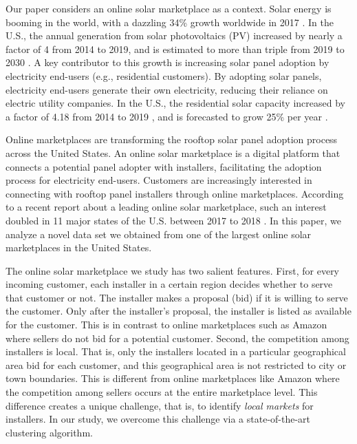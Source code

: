 \documentclass[msom,blindrev]{informs3}
\begin{document}
	
	Our paper considers an online solar marketplace as a context. Solar energy is booming in the world, with a dazzling 34\% growth worldwide in 2017 \citep{iea2018snapshot}. In the U.S., the annual generation from solar photovoltaics (PV) increased by nearly a factor of 4 from 2014 to 2019, and is estimated to more than triple from 2019 to 2030 \citep{USEIA-I,USEIA-II}. A key contributor to this growth is increasing solar panel adoption by electricity end-users (e.g., residential customers). By adopting solar panels, electricity end-users generate their own electricity, reducing their reliance on electric utility companies. In the U.S., the residential solar capacity increased by a factor of 4.18 from 2014 to 2019 \citep{USEIA-III}, and is forecasted to grow 25\% per year \citep{weaver_2019,seia,gtmsolar2018}.
	
	Online marketplaces are transforming the rooftop solar panel adoption process across the United States. An online solar marketplace is a digital platform that connects a potential panel adopter with installers, facilitating the adoption process for electricity end-users. Customers are increasingly interested in connecting with rooftop panel installers through online marketplaces. According to a recent report about a leading online solar marketplace, such an interest doubled in 11 major states of the U.S. between 2017 to 2018 \citep{energysageintel19}.  In this paper, we analyze a novel data set we obtained from one of the largest online solar marketplaces in the United States.
	
	
	The online solar marketplace we study has two salient features. First, for every incoming customer, each installer in a certain region decides whether to serve that customer or not. The installer makes a proposal (bid) if it is willing to serve the customer. Only after the installer's proposal, the installer is listed as available for the customer. This is in contrast to online marketplaces such as Amazon where sellers do not bid for a potential customer. Second, the competition among installers is local. That is, only the installers located in a particular geographical area bid for each customer, and this geographical area is not restricted to city or town boundaries. This is different from online marketplaces like Amazon where the competition among sellers occurs at the entire marketplace level. This difference creates a unique challenge, that is, to identify \emph{local markets} for installers. In our study, we overcome this challenge via a state-of-the-art clustering algorithm.
	
\end{document}
